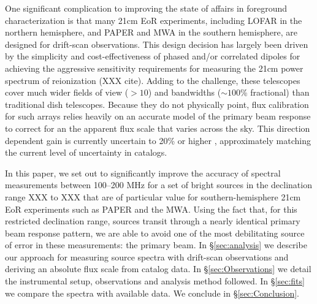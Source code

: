 \documentclass[preprint]{aastex}
\begin{document}
One significant complication to improving the state of affairs in foreground characterization
is that many 21cm EoR experiments, including LOFAR in the northern hemisphere, and
PAPER and MWA in the southern hemisphere, are designed for drift-scan observations.
This design decision has largely been driven by the simplicity and cost-effectiveness of
phased and/or correlated dipoles for achieving the aggressive sensitivity requirements
for measuring the 21cm power spectrum of reionization (XXX cite).
Adding to the challenge, these telescopes 
cover much wider fields of view ($>10$\arcdeg) and bandwidths
($\sim 100$\% fractional) than traditional dish telescopes.
Because they do not physically point, flux calibration for such arrays relies heavily
on an accurate model of the primary beam response to correct for an
the apparent flux scale that varies across the sky.
This direction dependent gain is currently uncertain to 20\% or higher
\citep{Jacobs:2013p9713}, approximately matching the current level of uncertainty in catalogs.

In this paper, we set out to significantly improve the accuracy of spectral measurements between 
100--200 MHz for a set of bright sources in the declination range XXX to XXX that
are of particular value for southern-hemisphere 21cm EoR experiments such as PAPER and the MWA.
Using the fact that, for this restricted declination range,
sources transit through a nearly identical primary beam response pattern, we are able to avoid one of the
most debilitating source of error in these measurements: the primary beam.  
In \S\ref{sec:analysis} we describe our approach for measuring source spectra with
drift-scan observations and deriving an absolute flux scale from catalog data.  
In \S\ref{sec:Observations} we detail the instrumental
setup, observations and analysis method followed. In \S\ref{sec:fits} we
compare the spectra with available data.  We conclude in 
\S\ref{sec:Conclusion}.



\end{document}
